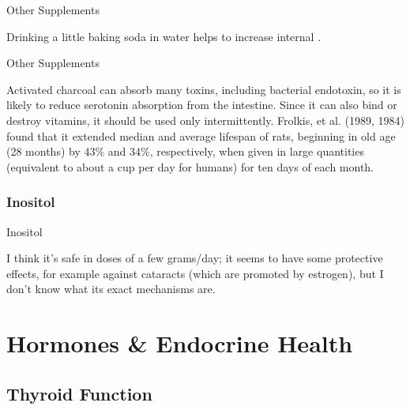 \documentclass[11pt,oneside,openany,extrafontsizes]{memoir}
\begin{document}
\begin{standalonequote}{Other Supplements}

    \begin{answer}
      Drinking a little baking soda in water helps to increase internal .
    \end{answer}
\end{standalonequote}

\begin{standalonequote}{Other Supplements}

    \begin{answer}
      Activated charcoal can absorb many toxins, including bacterial endotoxin, so it is likely to reduce serotonin absorption from the intestine. Since it can also bind or destroy vitamins, it should be used only intermittently. Frolkis, et al. (1989, 1984) found that it extended median and average lifespan of rats, beginning in old age (28 months) by 43\% and 34\%, respectively, when given in large quantities (equivalent to about a cup per day for humans) for ten days of each month.
    \end{answer}
\end{standalonequote}

\subsection{Inositol}

\begin{standalonequote}{Inositol}

    \begin{answer}
        I think it's safe in doses of a few grams/day; it seems to have some protective effects, for example against cataracts (which are promoted by estrogen), but I don't know what its exact mechanisms are.
    \end{answer}
\end{standalonequote}

\chapter{Hormones \& Endocrine Health}

\section{Thyroid Function}
\end{document}
